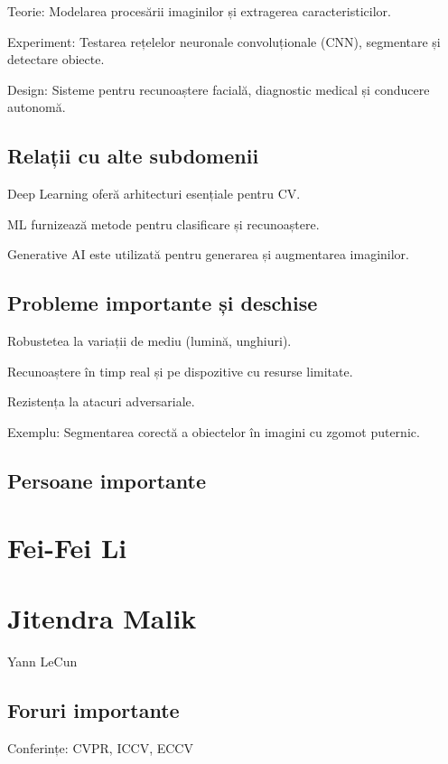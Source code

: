 \documentclass[12pt]{article}
\begin{document}
Teorie: Modelarea procesării imaginilor și extragerea caracteristicilor.

Experiment: Testarea rețelelor neuronale convoluționale (CNN), segmentare și detectare obiecte.

Design: Sisteme pentru recunoaștere facială, diagnostic medical și conducere autonomă.

\subsection*{Relații cu alte subdomenii}

Deep Learning oferă arhitecturi esențiale pentru CV.

ML furnizează metode pentru clasificare și recunoaștere.

Generative AI este utilizată pentru generarea și augmentarea imaginilor.

\subsection*{Probleme importante și deschise}

Robustetea la variații de mediu (lumină, unghiuri).

Recunoaștere în timp real și pe dispozitive cu resurse limitate.

Rezistența la atacuri adversariale.

Exemplu: Segmentarea corectă a obiectelor în imagini cu zgomot puternic.

\subsection*{Persoane importante}

\section*{Fei-Fei Li}

\section*{Jitendra Malik}

Yann LeCun

\subsection*{Foruri importante}

Conferințe: CVPR, ICCV, ECCV
\end{document}
